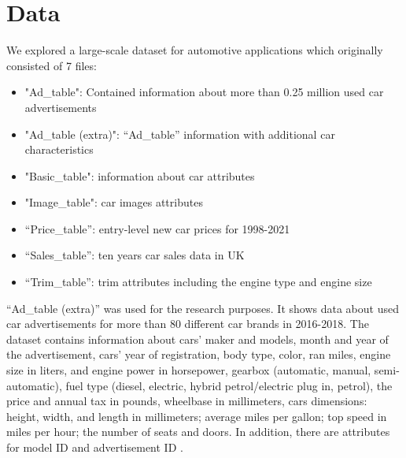 \section{Data}
We explored a large-scale dataset for automotive applications which originally consisted of 7 files:
\begin{itemize}
    \item "Ad\_table": Contained information about more than 0.25 million used car advertisements
    \item "Ad\_table (extra)": “Ad\_table” information with additional car characteristics
    \item "Basic\_table": information about car attributes
    \item "Image\_table": car images attributes
    \item “Price\_table”: entry-level new car prices for 1998-2021
    \item “Sales\_table”: ten years car sales data in UK
    \item “Trim\_table”: trim attributes including the engine type and engine size
\end{itemize}
“Ad\_table (extra)” was used for the research purposes. It shows data about used car advertisements for more than 80 different car brands in 2016-2018. The dataset contains information about cars' maker and models, month and year of the advertisement, cars' year of registration, body type, color, ran miles, engine size in liters, and engine power in horsepower, gearbox (automatic, manual, semi-automatic), fuel type (diesel, electric, hybrid petrol/electric plug in, petrol), the price and annual tax in pounds, wheelbase in millimeters, cars dimensions: height, width, and length in millimeters; average miles per gallon; top speed in miles per hour; the number of seats and doors. In addition, there are attributes for model ID and advertisement ID
\autocite{huangDVMCARLargescaleAutomotive2022}.

